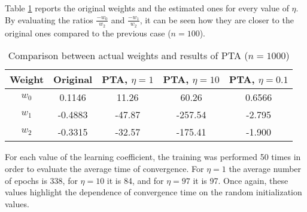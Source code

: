 \documentclass[12pt]{article}
\begin{document}
Table \ref{tab:eta-1000} reports the original weights and the estimated ones for every value of $\eta$.
By evaluating the ratios $\frac{-w_0}{w_2}$ and $\frac{-w_1}{w_2}$, it can be seen how they are closer to the original ones compared to the previous case ($n=100$).

\begin{table}[h]
    \centering
    \begin{tabular}{|c|c|c|c|c|}
        \hline
        Weight & \textbf{Original} & \textbf{PTA}, $\eta=1$ & \textbf{PTA}, $\eta=10$ & \textbf{PTA}, $\eta=0.1$ \\ 
        \hline
        \hline
        $w_0$ & 0.1146 & 11.26 & 60.26 & 0.6566 \\
        \hline
        $w_1$ & -0.4883 & -47.87 & -257.54 & -2.795 \\
        \hline
        $w_2$ & -0.3315 & -32.57 & -175.41 & -1.900 \\
        \hline
    \end{tabular}
    \caption{Comparison between actual weights and results of PTA ($n=1000$)}
    \label{tab:eta-1000}
\end{table}

For each value of the learning coefficient, the training was performed 50 times in order to evaluate the average time of convergence.
For $\eta=1$ the average number of epochs is 338, for $\eta=10$ it is 84, and for $\eta=97$ it is 97.
Once again, these values highlight the dependence of convergence time on the random initialization values.
\end{document}
